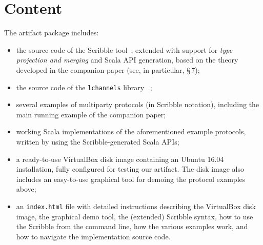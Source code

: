 \documentclass[a4paper,UKenglish]{darts}
\newenvironment{content}{\section{Content}}{}
\begin{document}
\begin{content}
  The artifact package includes:
  \begin{itemize}
  \item%
    the source code of %
    the Scribble tool~\cite{HY16}, %
    extended with support for \emph{type projection and merging} %
    and Scala API generation, %
    based on the theory developed in the companion paper %
    (see, in particular, \S\,7);%
  \item%
    the source code of the \texttt{lchannels} library~%
    \cite{ScalasY16,ScalasY16Artifact};%
  \item%
    several examples of multiparty protocols (in Scribble notation), %
    including the main running example of the companion paper;%
  \item%
    working Scala implementations of the aforementioned example protocols, %
    written by using the Scribble-generated Scala APIs;%
  \item%
    a ready-to-use VirtualBox disk image %
    containing an Ubuntu 16.04 installation, %
    fully configured for testing our artifact. %
    The disk image also includes an easy-to-use graphical tool %
    for demoing the protocol examples above;
  \item%
    an \texttt{index.html} file %
    with detailed instructions describing %
    the VirtualBox disk image, %
    the graphical demo tool, %
    the (extended) Scribble syntax, %
    how to use the Scribble from the command line, %
    how the various examples work, %
    and how to navigate the implementation source code.
  \end{itemize}
\end{content}
\end{document}
